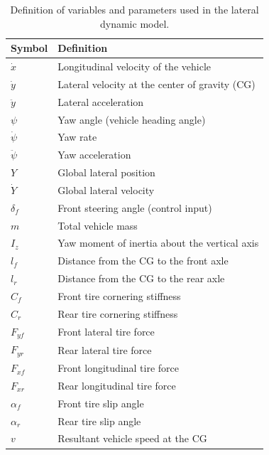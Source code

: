 \documentclass[letterpaper]{ifacconf}
\begin{document}
\begin{table}[htbp]
\centering
\caption{Definition of variables and parameters used in the lateral dynamic model.}
\label{tab:model_variables}
\begin{tabular}{ll}
\hline
Symbol & Definition \\
\hline
$\dot{x}$      & Longitudinal velocity of the vehicle \\
$\dot{y}$      & Lateral velocity at the center of gravity (CG) \\
$\ddot{y}$     & Lateral acceleration \\
$\psi$         & Yaw angle (vehicle heading angle) \\
$\dot{\psi}$   & Yaw rate \\
$\ddot{\psi}$  & Yaw acceleration \\
$Y$            & Global lateral position \\
$\dot{Y}$      & Global lateral velocity \\
$\delta_f$     & Front steering angle (control input) \\
$m$            & Total vehicle mass \\
$I_z$          & Yaw moment of inertia about the vertical axis \\
$l_f$          & Distance from the CG to the front axle \\
$l_r$          & Distance from the CG to the rear axle \\
$C_f$          & Front tire cornering stiffness \\
$C_r$          & Rear tire cornering stiffness \\
$F_{yf}$       & Front lateral tire force \\
$F_{yr}$       & Rear lateral tire force \\
$F_{xf}$       & Front longitudinal tire force \\
$F_{xr}$       & Rear longitudinal tire force \\
$\alpha_f$     & Front tire slip angle \\
$\alpha_r$     & Rear tire slip angle \\
$v$            & Resultant vehicle speed at the CG \\
\hline
\end{tabular}
\end{table}

\end{document}
